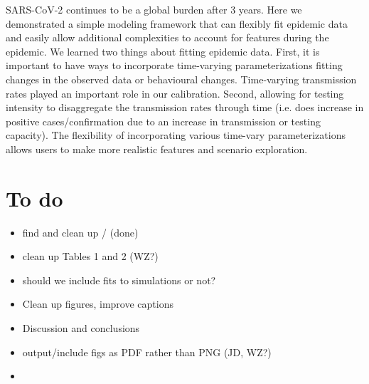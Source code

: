 \documentclass[12pt]{article}\usepackage[]{graphicx}\usepackage[]{color}
\begin{document}
SARS-CoV-2 continues to be a global burden after 3 years. 
Here we demonstrated a simple modeling framework that can flexibly fit epidemic data and easily allow additional complexities to account for features during the epidemic. 
We learned two things about fitting epidemic data. 
First, it is important to have ways to incorporate time-varying parameterizations fitting changes in the observed data or behavioural changes. Time-varying transmission rates played an important role in our calibration. 
Second, allowing for testing intensity to disaggregate the transmission rates through time (i.e. does increase in positive cases/confirmation due to an increase in transmission or testing capacity). 
The flexibility of incorporating various time-vary parameterizations allows users to make more realistic features and scenario exploration. 


\thickredline

\clearpage

\section{To do}

\begin{itemize}
\item find and clean up / (done)
\item clean up Tables 1 and 2 (WZ?)
\item should we include fits to simulations or not?
\item Clean up figures, improve captions  
\item Discussion and conclusions
\item output/include figs as PDF rather than PNG (JD, WZ?)
\item {}
\end{itemize}

\clearpage



\end{document}

